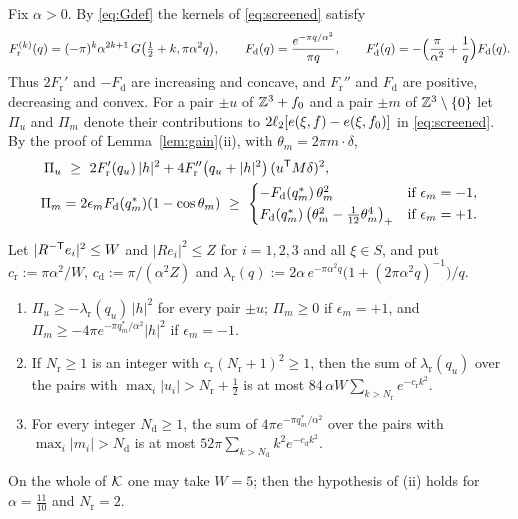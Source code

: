Fix $\alpha>0$. By \eqref{eq:Gdef} the kernels of \eqref{eq:screened} satisfy
\begin{equation}\label{eq:det-kernels}
  F_{\mathrm r}^{(k)}(q)=(-\pi)^k\alpha^{2k+1}\,G\bigl(\tfrac12+k,\pi\alpha^2q\bigr),\qquad
  F_{\mathrm d}(q)=\frac{e^{-\pi q/\alpha^2}}{\pi q},\qquad F_{\mathrm d}'(q)=-\Bigl(\frac\pi{\alpha^2}+\frac1q\Bigr)F_{\mathrm d}(q).
\end{equation}
Thus $2F_{\mathrm r}'$ and $-F_{\mathrm d}$ are increasing and concave, and $F_{\mathrm r}''$ and $F_{\mathrm d}$ are positive,
decreasing and convex. For a pair $\pm u$ of $\mathbb Z^3+f_0$ and a pair $\pm m$ of $\mathbb Z^3\setminus\{0\}$ let $\Pi_u$ and $\Pi_m$ denote their
contributions to $2\ell_2[e(\xi,f)-e(\xi,f_0)]$ in \eqref{eq:screened}. By the proof of Lemma~\ref{lem:gain}(ii), with
$\theta_m=2\pi m\cdot\delta$,
\begin{equation}\label{eq:det-pair}
\begin{aligned}
  \Pi_u&\ \ge\ 2F_{\mathrm r}'(q_u)\,|h|^2+4F_{\mathrm r}''\bigl(q_u+|h|^2\bigr)\,(u^\mathsf T M\delta)^2,\\
  \Pi_m&=2\epsilon_mF_{\mathrm d}(q^*_m)(1-\cos\theta_m)\ \ge\
   \begin{cases}-F_{\mathrm d}(q^*_m)\,\theta_m^2&\text{if }\epsilon_m=-1,\\[1pt]
   F_{\mathrm d}(q^*_m)\,\bigl(\theta_m^2-\tfrac1{12}\theta_m^4\bigr)_+&\text{if }\epsilon_m=+1.\end{cases}
\end{aligned}
\end{equation}

\begin{lemma}\label{lem:det-omit}
Let $|R^{-\mathsf T}e_i|^2\le W$ and $|Re_i|^2\le Z$ for $i=1,2,3$ and all $\xi\in S$, and put $c_{\mathrm r}:=\pi\alpha^2/W$,
$c_{\mathrm d}:=\pi/(\alpha^2Z)$ and $\lambda_{\mathrm r}(q):=2\alpha\,e^{-\pi\alpha^2q}\bigl(1+(2\pi\alpha^2q)^{-1}\bigr)/q$.
\begin{enumerate}
\item[\textup{(i)}] $\Pi_u\ge-\lambda_{\mathrm r}(q_u)\,|h|^2$ for every pair $\pm u$; $\Pi_m\ge0$ if $\epsilon_m=+1$, and
$\Pi_m\ge-4\pi e^{-\pi q^*_m/\alpha^2}|h|^2$ if $\epsilon_m=-1$.
\item[\textup{(ii)}] If $N_{\mathrm r}\ge1$ is an integer with $c_{\mathrm r}(N_{\mathrm r}+1)^2\ge1$, then the sum of
$\lambda_{\mathrm r}(q_u)$ over the pairs with $\max_i|u_i|>N_{\mathrm r}+\frac12$ is at most
$84\,\alpha W\sum_{k>N_{\mathrm r}}e^{-c_{\mathrm r}k^2}$.
\item[\textup{(iii)}] For every integer $N_{\mathrm d}\ge1$, the sum of $4\pi e^{-\pi q^*_m/\alpha^2}$ over the pairs with
$\max_i|m_i|>N_{\mathrm d}$ is at most $52\pi\sum_{k>N_{\mathrm d}}k^2e^{-c_{\mathrm d}k^2}$.
\end{enumerate}
On the whole of $\mathcal K$ one may take $W=5$; then the hypothesis of \textup{(ii)} holds for $\alpha=\frac{11}{10}$ and $N_{\mathrm r}=2$.
\end{lemma}

